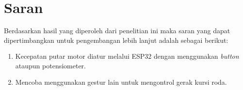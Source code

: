 \section{Saran}
\label{chap:saran}

Berdasarkan hasil yang diperoleh dari penelitian ini maka saran yang dapat dipertimbangkan untuk pengembangan lebih lanjut adalah sebagai berikut:

\begin{enumerate}

  \item Kecepatan putar motor diatur melalui ESP32 dengan menggunakan \emph{button} ataupun potensiometer.

  \item Mencoba menggunakan gestur lain untuk mengontrol gerak kursi roda.

\end{enumerate}
